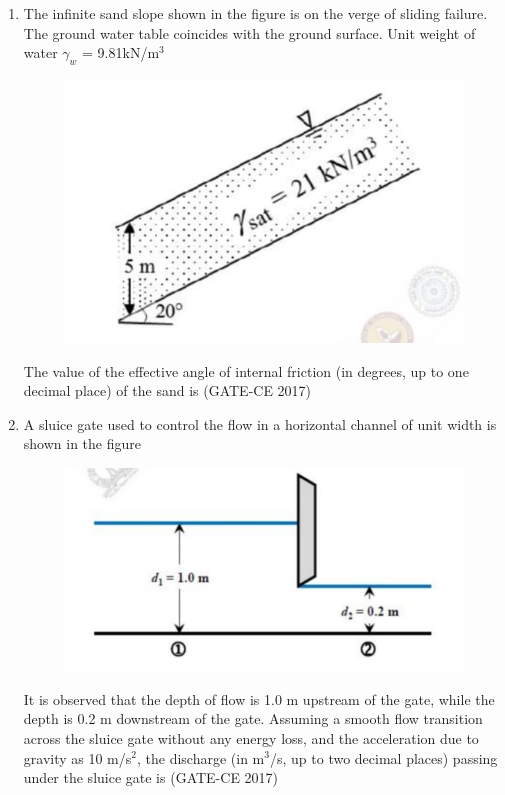 \documentclass[journal,12pt,onecolumn]{article}
\theoremstyle{remark}
\begin{document}
\begin{enumerate}
    \item The infinite sand slope shown in the figure  is on the verge of sliding failure. The ground water table coincides with the ground surface. Unit weight of water $\gamma_w$ = 9.81kN/m$^3$
    \begin{figure}[H]
    \centering
    \includegraphics[width=0.7\columnwidth]{figs/imageq47.jpg}  
    \caption{}
    \label{fig:47}
    \end{figure}
    The value of the effective angle of internal friction (in degrees, up to one decimal place) of the sand is \underline{\hspace{3cm}}\hfill (GATE-CE 2017)

    \item A sluice gate used to control the flow in a horizontal channel of unit width is shown in the figure 
    \begin{figure}[H]
    \centering
    \includegraphics[width=0.7\columnwidth]{figs/imageq48.jpg}  
    \caption{}
    \label{fig:48}
    \end{figure}
    It is observed that the depth of flow is 1.0 m upstream of the gate, while the depth is 0.2 m downstream of the gate. Assuming a smooth flow transition across the sluice gate without any energy loss, and the acceleration due to gravity as 10 m/s$^2$, the discharge (in m$^3$/s, up to two decimal places) passing under the sluice gate is \underline{\hspace{3cm}}\hfill (GATE-CE 2017)


\end{enumerate}
\end{document}
